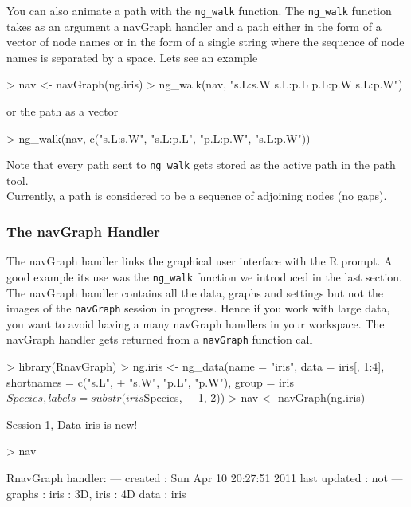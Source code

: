 \documentclass[12pt,oneside,titlepage,letter]{article}
\newcommand{\modify}[1]{{\color{blue}#1}}
\begin{document}
You can also animate a path with the \texttt{ng\_walk} function. The \texttt{ng\_walk} function takes as an argument a navGraph handler and a path either in the form of a vector of node names or in the form of a single string where the sequence of node names is separated by a space. Lets see an example

\begin{Schunk}
\begin{Sinput}
> nav <- navGraph(ng.iris)
> ng_walk(nav, "s.L:s.W s.L:p.L p.L:p.W s.L:p.W")
\end{Sinput}
\end{Schunk}
or the path as a vector
\begin{Schunk}
\begin{Sinput}
> ng_walk(nav, c("s.L:s.W", "s.L:p.L", "p.L:p.W", "s.L:p.W"))
\end{Sinput}
\end{Schunk}
Note that every path sent to \texttt{ng\_walk} gets stored as the active path in the path tool.\\

\modify{Currently, a path is considered to be a sequence of adjoining nodes (no gaps).}

\subsubsection{The navGraph Handler}
The navGraph handler links the graphical user interface with the R prompt. A good example its use was the \texttt{ng\_walk} function we introduced in the last section. The navGraph handler contains all the data, graphs and settings \modify{but not the images} of the \texttt{navGraph} session in progress. Hence if you work with large data, you want to avoid having a many navGraph handlers in your workspace. The navGraph handler gets returned from a \texttt{navGraph} function call
\begin{Schunk}
\begin{Sinput}
> library(RnavGraph)
> ng.iris <- ng_data(name = "iris", data = iris[, 1:4], shortnames = c("s.L", 
+     "s.W", "p.L", "p.W"), group = iris$Species, labels = substr(iris$Species, 
+     1, 2))
> nav <- navGraph(ng.iris)
\end{Sinput}
\begin{Soutput}
Session 1, Data iris is new!
\end{Soutput}
\begin{Sinput}
> nav
\end{Sinput}
\begin{Soutput}
RnavGraph handler:
---
created       : Sun Apr 10 20:27:51 2011 
last updated  : not 
---
graphs        : iris : 3D, iris : 4D 
data          : iris 
\end{Soutput}
\end{Schunk}
\end{document}
